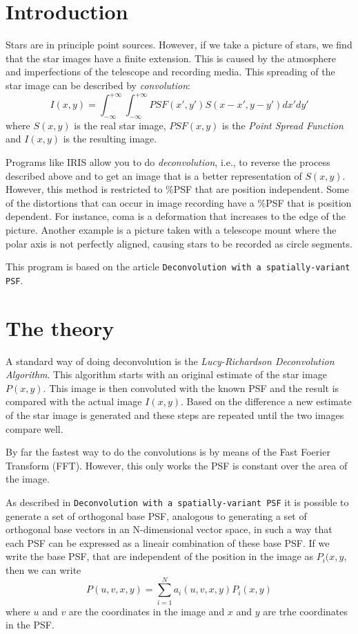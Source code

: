 \section{Introduction}\label{index_introduction}
Stars are in principle point sources. However, if we take a picture of stars, we find that the star images have a finite extension. This is caused by the atmosphere and imperfections of the telescope and recording media. This spreading of the star image can be described by {\itshape convolution\/}: \[I(x, y) = \int _{-\infty} ^ {+\infty} \int _{-\infty} ^ {+\infty} PSF(x', y') S(x-x', y-y')dx' dy'\] where $S(x,y)$ is the real star image, $PSF(x,y)$ is the {\itshape Point Spread Function\/} and $I(x,y)$ is the resulting image.

Programs like IRIS allow you to do {\itshape deconvolution\/}, i.e., to reverse the process described above and to get an image that is a better representation of $S(x,y)$. However, this method is restricted to \%PSF that are position independent. Some of the distortions that can occur in image recording have a \%PSF that is position dependent. For instance, coma is a deformation that increases to the edge of the picture. Another example is a picture taken with a telescope mount where the polar axis is not perfectly aligned, causing stars to be recorded as circle segments.

This program is based on the article {\tt Deconvolution with a spatially-\/variant PSF}.\section{The theory}\label{index_theory}
A standard way of doing deconvolution is the {\itshape Lucy-\/Richardson Deconvolution Algorithm\/}. This algorithm starts with an original estimate of the star image $P(x,y)$. This image is then convoluted with the known PSF and the result is compared with the actual image $I(x,y)$. Based on the difference a new estimate of the star image is generated and these steps are repeated until the two images compare well.

By far the fastest way to do the convolutions is by means of the Fast Foerier Transform (FFT). However, this only works the PSF is constant over the area of the image.

As described in {\tt Deconvolution with a spatially-\/variant PSF} it is possible to generate a set of orthogonal base PSF, analogous to generating a set of orthogonal base vectors in an N-\/dimensional vector space, in such a way that each PSF can be expressed as a lineair combination of these base PSF. If we write the base PSF, that are independent of the position in the image as $P_i(x,y$, then we can write \[ P(u, v,x,y) = \sum _ {i = 1} ^ N a_i(u, v, x,y) P_i(x,y) \] where $u$ and $v$ are the coordinates in the image and $x$ and $y$ are trhe coordinates in the PSF.


